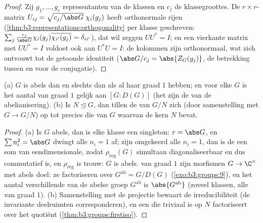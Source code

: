 \begin{proof}
Zij $g_1, \dots, g_r$ representanten van de klassen en $c_j$ de
klassegroottes. De $r \times r$-matrix $U_{ij} =
\sqrt{c_j/\abs G}\;\chi_i(g_j)$ heeft orthonormale rijen
(\cref{thm:b3:representations:orthogonality} per klasse
geschreven: $\sum_j \frac{c_j}{\abs
G}\chi_i(g_j)\overline{\chi_{i'}(g_j)} = \delta_{ii'}$), dat wil
zeggen $UU^* = I$; en een vierkante matrix met $UU^* = I$ voldoet
ook aan $U^*U = I$: de kolommen zijn orthonormaal, wat zich
ontvouwt tot de getoonde identiteit ($\abs G/c_j =
\abs{Z_G(g_j)}$, de betrekking tussen  en  voor de
conjugatie).
\end{proof}

\begin{proposition}
\label{prop:b3:representations:onedim}
(a) $G$ is abels dan en slechts dan als al haar  graad $1$ hebben; en voor elke $G$ is het aantal
 van graad $1$ gelijk aan $[G : D(G)]$ (het zijn de
 van de abelianisering).
(b) Is $N \trianglelefteq G$, dan tillen de  van $G/N$ zich (door samenstelling met $G \to G/N$)
op tot precies die  van $G$ waarvan de
kern $N$ bevat.
\end{proposition}

\begin{proof}
(a) Is $G$ abels, dan is elke klasse een singleton: $r = \abs G$,
en $\sum n_i^2 = \abs G$ dwingt alle $n_i = 1$ af; zijn omgekeerd
alle $n_i = 1$, dan is de  een som van
eendimensionale, zodat $\rho_{\mathrm{reg}}(G)$ simultaan
diagonaliseerbaar en dus commutatief is, en $\rho_{\mathrm{reg}}$
is trouw: $G$ is abels.  van graad $1$ zijn
morfismen $G \to \C^\times$ met abels doel: ze factoriseren over
$G^{\mathrm{ab}} = G/D(G)$ (\cref{exo:b3:groups:9}), en het aantal
verschillende  van de abelse groep $G^{\mathrm{ab}}$ is
$\abs{G^{\mathrm{ab}}}$ (zoveel klassen, alle van graad $1$). (b)
Samenstelling met de projectie bewaart de irreducibiliteit (de
invariante deelruimten corresponderen), en een  die
triviaal is op $N$ factoriseert over het quotiënt
(\cref{thm:b3:groups:firstiso}).
\end{proof}

